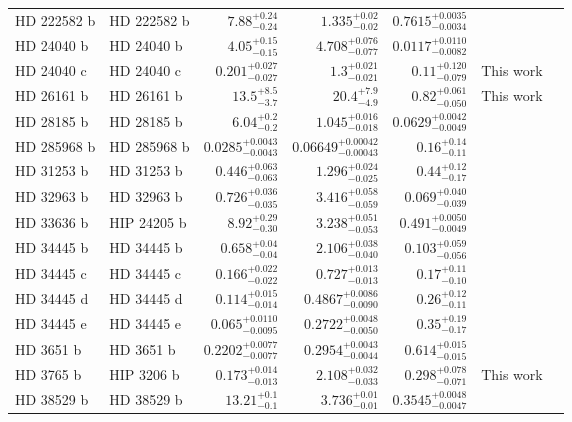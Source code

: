 \begin{longtable*}{llrrrrr}
HD 222582 b & HD 222582 b & $7.88^{+0.24}_{-0.24}$ & $1.335^{+0.02}_{-0.02}$ & $0.7615^{+0.0035}_{-0.0034}$ & \cite{Vogt00} & \\
HD 24040 b & HD 24040 b & $4.05^{+0.15}_{-0.15}$ & $4.708^{+0.076}_{-0.077}$ & $0.0117^{+0.0110}_{-0.0082}$ & \cite{Boisse12} & \\
HD 24040 c & HD 24040 c & $0.201^{+0.027}_{-0.027}$ & $1.3^{+0.021}_{-0.021}$ & $0.11^{+0.120}_{-0.079}$ & This work & \\
HD 26161 b & HD 26161 b & $13.5^{+8.5}_{-3.7}$ & $20.4^{+7.9}_{-4.9}$ & $0.82^{+0.061}_{-0.050}$ & This work & \\
HD 28185 b & HD 28185 b & $6.04^{+0.2}_{-0.2}$ & $1.045^{+0.016}_{-0.018}$ & $0.0629^{+0.0042}_{-0.0049}$ & \cite{Santos01} & \\
HD 285968 b & HD 285968 b & $0.0285^{+0.0043}_{-0.0043}$ & $0.06649^{+0.00042}_{-0.00043}$ & $0.16^{+0.14}_{-0.11}$ & \cite{Forveille09} & \\
HD 31253 b & HD 31253 b & $0.446^{+0.063}_{-0.063}$ & $1.296^{+0.024}_{-0.025}$ & $0.44^{+0.12}_{-0.17}$ & \cite{Meschiari11} & \\
HD 32963 b & HD 32963 b & $0.726^{+0.036}_{-0.035}$ & $3.416^{+0.058}_{-0.059}$ & $0.069^{+0.040}_{-0.039}$ & \cite{Rowan16} & \\
HD 33636 b & HIP 24205 b & $8.92^{+0.29}_{-0.30}$ & $3.238^{+0.051}_{-0.053}$ & $0.491^{+0.0050}_{-0.0049}$ & \cite{Vogt02} & \\
HD 34445 b & HD 34445 b & $0.658^{+0.04}_{-0.04}$ & $2.106^{+0.038}_{-0.040}$ & $0.103^{+0.059}_{-0.056}$ & \cite{Howard10} & \\
HD 34445 c & HD 34445 c & $0.166^{+0.022}_{-0.022}$ & $0.727^{+0.013}_{-0.013}$ & $0.17^{+0.11}_{-0.10}$ & \cite{Vogt17} & \\
HD 34445 d & HD 34445 d & $0.114^{+0.015}_{-0.014}$ & $0.4867^{+0.0086}_{-0.0090}$ & $0.26^{+0.12}_{-0.11}$ & \cite{Vogt17} & \\
HD 34445 e & HD 34445 e & $0.065^{+0.0110}_{-0.0095}$ & $0.2722^{+0.0048}_{-0.0050}$ & $0.35^{+0.19}_{-0.17}$ & \cite{Vogt17} & \\
HD 3651 b & HD 3651 b & $0.2202^{+0.0077}_{-0.0077}$ & $0.2954^{+0.0043}_{-0.0044}$ & $0.614^{+0.015}_{-0.015}$ & \cite{Butler06} & \\
HD 3765 b & HIP 3206 b & $0.173^{+0.014}_{-0.013}$ & $2.108^{+0.032}_{-0.033}$ & $0.298^{+0.078}_{-0.071}$ & This work & \\
HD 38529 b & HD 38529 b & $13.21^{+0.1}_{-0.1}$ & $3.736^{+0.01}_{-0.01}$ & $0.3545^{+0.0048}_{-0.0047}$ & \cite{Fischer01} & \\

\end{longtable*}
